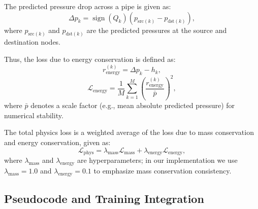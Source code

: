 \documentclass[final,5p,times,twocolumn,authoryear]{elsarticle}
\begin{document}
The predicted pressure drop across a pipe is given as:
\[
\Delta p_k
=
\operatorname{sign}(Q_k) \left( p_{\mathrm{src}(k)} - p_{\mathrm{dst}(k)} \right),
\]
where $p_{\mathrm{src}(k)}$ and $p_{\mathrm{dst}(k)}$ are the predicted pressures at the source and destination nodes.

Thus, the loss due to energy conservation is defined as:
\[
r^{(k)}_{\mathrm{energy}}
=
\Delta p_k - h_k,
\]
\[
\mathcal{L}_{\mathrm{energy}}
=
\frac{1}{M} \sum_{k=1}^{M} \left( \frac{r^{(k)}_{\mathrm{energy}}}{\bar{p}} \right)^2,
\]
where $\bar{p}$ denotes a scale factor (e.g., mean absolute predicted pressure) for numerical stability.

The total physics loss is a weighted average of the loss due to mass conservation and energy conservation, given as:
\[
\mathcal{L}_{\mathrm{phys}}
=
\lambda_{\mathrm{mass}} \mathcal{L}_{\mathrm{mass}}
+
\lambda_{\mathrm{energy}} \mathcal{L}_{\mathrm{energy}},
\]
where $\lambda_{\mathrm{mass}}$ and $\lambda_{\mathrm{energy}}$ are hyperparameters; in our implementation we use $\lambda_{\mathrm{mass}} = 1.0$ and $\lambda_{\mathrm{energy}} = 0.1$ to emphasize mass conservation consistency.

\subsection{Pseudocode and Training Integration}
\end{document}
